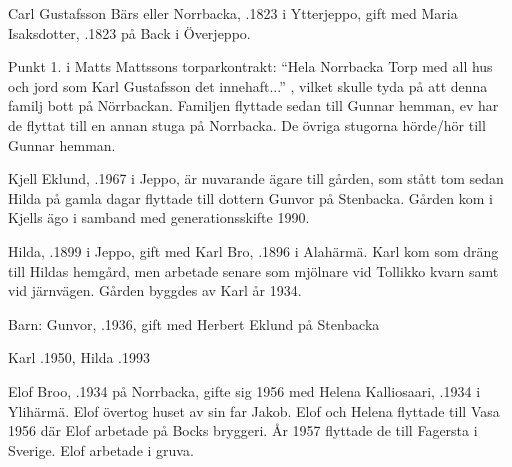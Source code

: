 Carl Gustafsson Bärs eller Norrbacka, .1823 i Ytterjeppo, gift med Maria Isaksdotter, .1823 på Back i Överjeppo.

\begin{jhchildren}
  \item {}
  \item {}
  \item {}
  \item {}
  \item {}
  \item {}
\end{jhchildren}

Punkt 1. i  Matts Mattssons torparkontrakt: ``Hela Norrbacka Torp med all hus och jord som Karl Gustafsson det innehaft...'' , vilket skulle tyda på att denna familj bott på Nörrbackan. Familjen flyttade sedan till Gunnar hemman, ev har de flyttat till en annan stuga på Norrbacka. De övriga stugorna hörde/hör till Gunnar hemman.






Kjell Eklund, .1967 i Jeppo, är nuvarande ägare till gården, som stått tom sedan Hilda på gamla dagar flyttade till dottern Gunvor på Stenbacka. Gården kom i Kjells ägo i samband med generationsskifte 1990.\jhvspace{}


Hilda, .1899 i Jeppo, gift med Karl Bro, .1896 i Alahärmä. Karl kom som dräng till Hildas hemgård, men arbetade senare som mjölnare vid Tollikko kvarn samt vid järnvägen. Gården byggdes av Karl år 1934.

Barn: Gunvor, .1936, gift med Herbert Eklund på Stenbacka

Karl .1950, Hilda .1993






Elof Broo, .1934 på Norrbacka, gifte sig 1956 med Helena Kalliosaari, .1934 i Ylihärmä. Elof övertog huset av sin far Jakob. Elof och Helena flyttade till Vasa 1956 där Elof arbetade på Bocks bryggeri. År 1957 flyttade de till Fagersta i Sverige. Elof arbetade i gruva.


